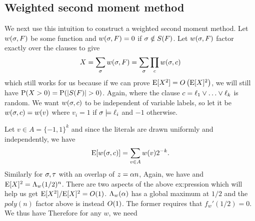 \documentclass[letterpaper, 10pt, twocolumn, reqno]{amsart}
\begin{document}
\subsection{Weighted second moment method}
\label{ssec:ksat_weighted}
We next use this intuition to construct a weighted second moment method. Let $w(\sigma,F)$ be some function and $w(\sigma,F) = 0$ if $\sigma \notin S(F)$. Let $w(\sigma,F)$ factor exactly over the clauses to give
$$X = \sum_\sigma w(\sigma,F) = \sum_\sigma \prod_c w(\sigma,c)$$
which still works for us because if we can prove $\textrm{E}[X^2] = O\left(\textrm{E}[X]^2\right)$, we will still have $\textrm{P}(X > 0) = \textrm{P}(\left| S(F) \right| > 0)$. Again,
where the clause $c = \ell_1 \vee \ldots \vee \ell_k$ is random. We want $w(\sigma,c)$ to be independent of variable labels, so let it be $w(\sigma,c) = w(v)$ where $v_i =1$ if $\sigma \models \ell_i$ and $-1$ otherwise.

Let $v \in A = \{-1,1\}^k$ and since the literals are drawn uniformly and independently, we have
$$
\textrm{E}[w(\sigma,c)] = \sum_{v \in A} w(v) 2^{-k}.
$$
Similarly for $\sigma, \tau$ with an overlap of $z =\alpha n$,
Again, we have
and $\textrm{E}[X]^2 = \Lambda_w(1/2)^n$. There are two aspects of the above ex:pression which will help us get $\textrm{E}[X^2]/\textrm{E}[X]^2 = O(1)$. $\Lambda_w(\alpha)$ has a global maximum at $1/2$ and the $poly(n)$ factor above is instead $O(1)$. The former requires that $f_w'(1/2) =0$. We thus have
Therefore for any $w$, we need
\end{document}
